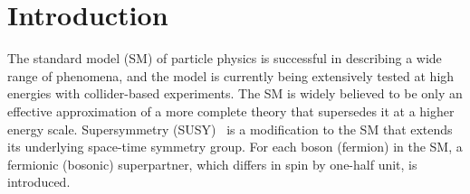 \section{Introduction}
\label{sec:introduction}

The standard model (SM) of particle physics is successful in
describing a wide range of phenomena, and the model is currently being
extensively tested at high energies with collider-based experiments. 
The SM is widely believed to be only an effective approximation of a
more complete theory that supersedes it at a higher energy
scale. Supersymmetry (SUSY)~\cite{ref:SUSY-1, ref:SUSY0, ref:SUSY3,
  ref:SUSY1} is a modification to the SM that extends its underlying
space-time symmetry group. For each boson (fermion) in the SM, a
fermionic (bosonic) superpartner, which differs in spin by one-half
unit, is introduced.



